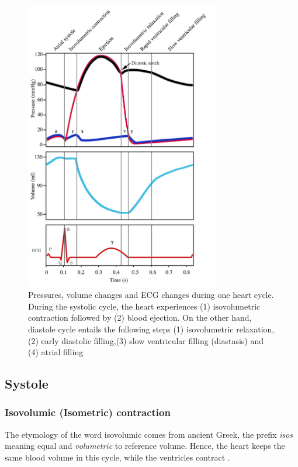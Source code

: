 \begin{figure}[!htpb]
	\centering
	\includegraphics[width=8.5cm,keepaspectratio]{figure_pressure}    
	\caption[Changes of Pressure and Volume in the heart - ECG]{Pressures, volume changes and ECG changes during one heart cycle. During the systolic cycle, the heart experiences (1) isovolumetric contraction followed by (2) blood ejection. On the other hand, diastole cycle entails the following steps (1) isovolumetric relaxation, (2) early diastolic filling,(3) slow ventricular filling (diastasis) and (4) atrial filling \cite{fukuta2008cardiac}}
	\label{fig:heart cycle}
\end{figure}

\subsection{Systole}
\subsubsection{Isovolumic (Isometric) contraction}
The etymology of the word isovolumic comes from ancient Greek, the prefix \textit{isos} meaning equal and \textit{volumetric} to reference volume. Hence, the heart keeps the same blood volume in this cycle, while the ventricles contract \cite{Hall:2015aa}.

